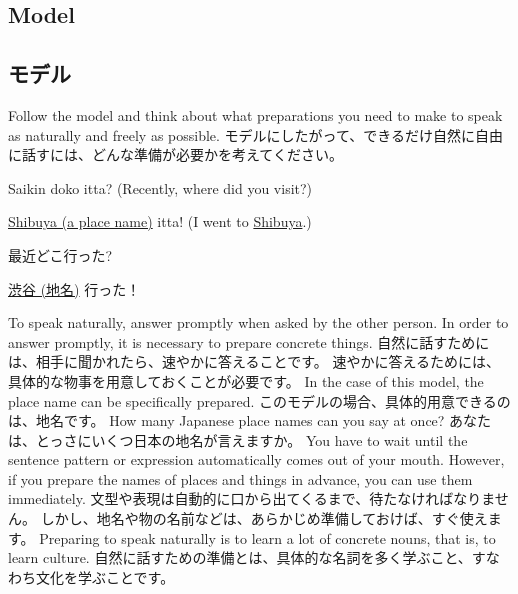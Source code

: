 \documentclass[uplatex,dvipdfmx,b5paper,english,10pt]{jsbook}
\begin{document}
\ifEnglish
\subsection{Model}
\else
\subsection{モデル}
\fi

\begin{toiquestion}
\ifEnglish
Follow the model and think about what preparations you need to make to speak as naturally and freely as possible.
\else
モデルにしたがって、できるだけ自然に自由に話すには、どんな準備が必要かを考えてください。
\fi
\end{toiquestion}

\begin{description}
\ifEnglish
 \item[A:] Saikin doko itta? (Recently, where did you visit?)
 \item[B:] \underline{Shibuya (a place name)} itta! (I went to \underline{Shibuya}.)
\else
 \item[A:] 最近どこ行った?
 \item[B:] \underline{渋谷 (地名)} 行った！
\fi
\end{description}

\begin{toianswer}
\ifEnglish
To speak naturally, answer promptly when asked by the other person.
In order to answer promptly, it is necessary to prepare concrete things.
\else
自然に話すためには、相手に聞かれたら、速やかに答えることです。
速やかに答えるためには、具体的な物事を用意しておくことが必要です。
\fi
\ifEnglish
In the case of this model, the place name can be specifically prepared.
\else
このモデルの場合、具体的用意できるのは、地名です。
\fi
\ifEnglish
How many Japanese place names can you say at once?
\else
あなたは、とっさにいくつ日本の地名が言えますか。
\fi
\ifEnglish
You have to wait until the sentence pattern or expression automatically comes out of your mouth.
However, if you prepare the names of places and things in advance, you can use them immediately.
\else
文型や表現は自動的に口から出てくるまで、待たなければなりません。
しかし、地名や物の名前などは、あらかじめ準備しておけば、すぐ使えます。
\fi
\ifEnglish
Preparing to speak naturally is to learn a lot of concrete nouns, that is, to learn culture.
\else
自然に話すための準備とは、具体的な名詞を多く学ぶこと、すなわち文化を学ぶことです。
\fi
\end{toianswer}
\end{document}

